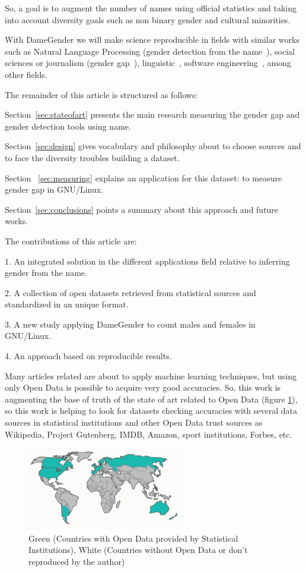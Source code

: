\documentclass[a4paper]{article}
\begin{document}
So, a goal is to augment the number of names using official statistics
and taking into account diversity goals such as non binary gender and
cultural minorities.

With DameGender we will make science reproducible\cite{peng2011reproducible}
in fields with similar works such as Natural Language Processing
(gender detection from the name~\cite{sun2019mitigating}), social
sciences or journalism (gender
gap~\cite{holman2018gender,mislove2011understanding,niemi2017gendered,de2014genero}),
linguistic~\cite{hutson2016gender,al2009socio},
software engineering~\cite{vasilescu2012gender}, among other fields.

The remainder of this article is structured as follows:

Section~\ref{sec:stateofart} presents the main research measuring the
gender gap and gender detection tools using name.

Section~\ref{sec:design} gives vocabulary and philosophy about to
choose sources and to face the diversity troubles building a dataset.

Section ~\ref{sec:measuring} explains an application for this
dataset: to measure gender gap in GNU/Linux.

Section~\ref{sec:conclusions} points a summary about this approach and
future works.

The contributions of this article are:

1. An integrated solution in the different applications field relative
to inferring gender from the name.

2. A collection of open datasets retrieved from statistical sources
and standardized in an unique format.

3. A new study applying DameGender to count males and females in
GNU/Linux.

4. An approach based on reproducible results.

Many articles related are about to apply machine learning techniques,
but using only Open Data is possible to acquire very good accuracies.
So, this work is augmenting the base of truth of the state of art
related to Open Data (figure \ref{fig:mapamundi}), so this work is
helping to look for datasets checking accuracies with several data
sources in statistical institutions and other Open Data trust sources
as Wikipedia, Project Gutenberg, IMDB, Amazon, sport institutions,
Forbes, etc.

\begin{figure}
  \centering
  \includegraphics[width=0.6\textwidth]{images/Simple_world_map_edit.pdf}
  \caption[Caption for LOF]{Green (Countries with Open Data provided by Statistical Institutions), White (Countries without Open Data or don't reproduced by the author)}
  \label{fig:mapamundi}
\end{figure}
\end{document}
